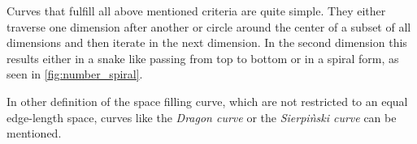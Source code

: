 Curves that fulfill all above mentioned criteria are quite simple. They either traverse one dimension after another or circle around the center of a subset of all dimensions and then iterate in the next dimension. In the second dimension this results either in a snake like passing from top to bottom or in a spiral form, as seen in \ref{fig:number_spiral}.

In other definition of the space filling curve, which are not restricted to an equal edge-length space, curves like the \emph{Dragon curve} or the \emph{Sierpi\`nski curve} can be mentioned.


